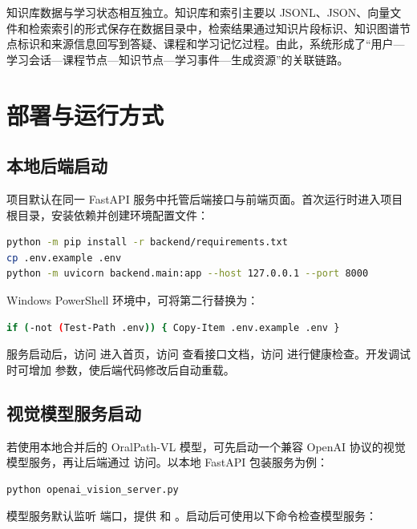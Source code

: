 知识库数据与学习状态相互独立。知识库和索引主要以 JSONL、JSON、向量文件和检索索引的形式保存在数据目录中，检索结果通过知识片段标识、知识图谱节点标识和来源信息回写到答疑、课程和学习记忆过程。由此，系统形成了“用户—学习会话—课程节点—知识节点—学习事件—生成资源”的关联链路。

\section{部署与运行方式}

\subsection{本地后端启动}

项目默认在同一 FastAPI 服务中托管后端接口与前端页面。首次运行时进入项目根目录，安装依赖并创建环境配置文件：

\begin{lstlisting}[language=bash,caption={后端本地启动命令},label={lst:backend-start}]
python -m pip install -r backend/requirements.txt
cp .env.example .env
python -m uvicorn backend.main:app --host 127.0.0.1 --port 8000
\end{lstlisting}

Windows PowerShell 环境中，可将第二行替换为：

\begin{lstlisting}[language=bash]
if (-not (Test-Path .env)) { Copy-Item .env.example .env }
\end{lstlisting}

服务启动后，访问  进入首页，访问  查看接口文档，访问  进行健康检查。开发调试时可增加  参数，使后端代码修改后自动重载。


\subsection{视觉模型服务启动}

若使用本地合并后的 OralPath-VL 模型，可先启动一个兼容 OpenAI 协议的视觉模型服务，再让后端通过  访问。以本地 FastAPI 包装服务为例：

\begin{lstlisting}[language=bash,caption={本地视觉模型服务启动示例},label={lst:vision-model-start}]
python openai_vision_server.py
\end{lstlisting}

模型服务默认监听  端口，提供  和 。启动后可使用以下命令检查模型服务：

